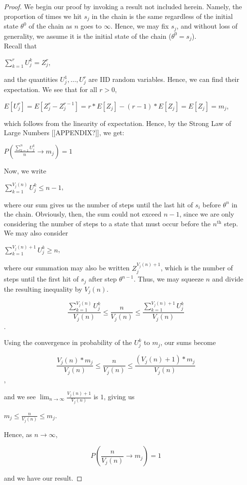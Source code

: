 \documentclass[12pt,twoside]{reedthesis}
\begin{document}
		\begin{proof}
		We begin our proof by invoking a result not included herein. Namely, the proportion of times we hit $s_j$ in the chain is the same regardless of the initial state $\theta^0$ of the chain as $n$ goes to $\infty$. Hence, we may fix $s_j$, and without loss of generality, we assume it is the initial state of the chain ($\theta^0 = s_j$). \\
		
		Recall that 
		\begin{center}
		 $\displaystyle\sum_{k=1}^{r}U_j^k 
		 = Z_j^r$,
		 \end{center}
		 and the quantities $U_j^1, \ldots, U_j^r$ are IID random variables.
		 Hence, we can find their expectation. 
		 We see that for all $r > 0$,
		\begin{center}
		$E[U_{j}^r] = E[Z_j^{r} - Z_j^{r-1}] = r *E[Z_j] - (r-1) *E[Z_j] = E[Z_j] = m_j$, 
		\end{center}
		which follows from the linearity of expectation.
		Hence, by the Strong Law of Large Numbers [[APPENDIX?]], we get: 
		\begin{center}
		$
		P\left(\displaystyle\frac{\sum_{k=1}^{n}U_j^k}{n} \rightarrow m_j \right) = 1
		$
		\end{center}
		Now, we write
		\begin{center}
		$\displaystyle\sum_{k=1}^{V_j(n)}U_j^k \leq n -1$, 
		\end{center}
		where our sum gives us the number of steps until the last hit of $s_i$ before $\theta^n$ in the chain.
		Obviously, then, the sum could not exceed $n -1$, since we are only considering the number of steps to a state that must occur before the $n^{\textrm{th}}$ step. We may also consider 
		\begin{center}
		$\displaystyle\sum_{k=1}^{V_j(n) + 1}U_j^k \geq n$,
		\end{center}
		where our summation may also be written $Z_j^{V_j(n) + 1}$, which is the number of steps until the first hit of $s_j$ after step $\theta^{n-1}$. 
		Thus, we may squeeze $n$ and divide the resulting inequality by $V_j(n)$.
		\begin{center}
		$$\displaystyle\frac{\displaystyle\sum_{k=1}^{V_j(n)}U_j^k}{V_j(n)} \leq 
		\frac{n}{V_j(n)} \leq 
		\frac{\displaystyle\sum_{k=1}^{V_j(n) + 1}U_j^k}{V_j(n)}$$.
		\end{center}
		Using the convergence in probability of the $U_j^k$ to $m_j$, our sums become
		\begin{center}
		$$\displaystyle\frac{V_j(n) * m_j}{V_j(n)} \leq 
		\frac{n}{V_j(n)} \leq 
		\frac{(V_j(n)+1) * m_j}{V_j(n)}$$,
		\end{center}		
		 and we see $\lim_{n \rightarrow \infty}\frac{V_j(n) +1 }{V_j(n)}$ is $1$, giving us
		 \begin{center}
		 	$ m_j \leq \displaystyle\frac{n}{V_j(n)} \leq m_j$.
		 \end{center}
		 Hence, as $n \rightarrow \infty$,
		 \begin{center}
		 $$
		 P\left( \displaystyle\frac{n}{V_j(n)} \longrightarrow {m_j} \right) = 1
		 $$
		 \end{center}
		 and we have our result.
		 \end{proof}
\end{document}
